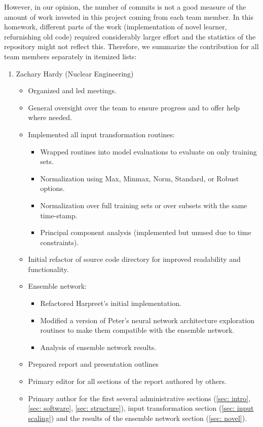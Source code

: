 \documentclass[paper=a4, fontsize=11pt]{scrartcl} %
\begin{document}
However, in our opinion, the number of commits is not a good measure of the amount of work invested in this project coming from each team member.
In this homework, different parts of the work (implementation of novel learner, refurnishing old code) required considerably larger effort and the statistics of the repository might not reflect this.  
Therefore, we summarize the contribution for all team members separately in itemized lists: 
\begin{enumerate}
	\item Zachary Hardy (Nuclear Engineering)
	\begin{itemize}
		\item Organized and led meetings.
		\item General oversight over the team to ensure progress and to offer help where needed.
		\item Implemented all input transformation routines:
		\begin{itemize}
			\item Wrapped routines into model evaluations to evaluate on only training sets.
			\item Normalization using Max, Minmax, Norm, Standard, or Robust options.
			\item Normalization over full training sets or over subsets with the same time-stamp.
			\item Principal component analysis (implemented but unused due to time constraints).
		\end{itemize}
		\item Initial refactor of source code directory for improved readability and functionality.
		\item Ensemble network:
		\begin{itemize}
			\item Refactored Harpreet's initial implementation.
			\item Modified a version of Peter's neural network architecture exploration routines to make them compatible with the ensemble network.
			\item Analysis of ensemble network results. 
		\end{itemize}
		\item Prepared report and presentation outlines
		\item Primary editor for all sections of the report authored by others.
		\item Primary author for the first several administrative sections (\ref{sec: intro}, \ref{sec: software}, \ref{sec: structure}), input transformation section (\ref{sec: input scaling}) and the results of the ensemble network section (\ref{sec: novel}).

\end{itemize}
\end{enumerate}
\end{document}

